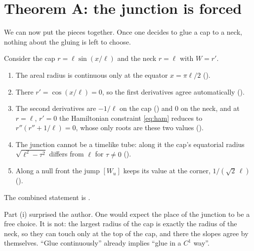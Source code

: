 \section{Theorem A: the junction is forced}

We can now put the pieces together. Once one decides to glue a cap to a neck, nothing about the gluing is left to choose.

\begin{theorem}\proved\label{thm:A}
Consider the cap $r=\ell\sin(x/\ell)$ and the neck $r=\ell$ with $W=r'$.
\begin{enumerate}[label=(\roman*)]
\item The areal radius is continuous only at the equator $x=\pi\ell/2$ ().
\item There $r'=\cos(x/\ell)=0$, so the first derivatives agree automatically ().
\item The second derivatives are $-1/\ell$ on the cap () and $0$ on the neck, and at $r=\ell$, $r'=0$ the Hamiltonian constraint \eqref{eq:ham} reduces to $r''(r''+1/\ell)=0$, whose only roots are these two values ().
\item The junction cannot be a timelike tube: along it the cap's equatorial radius $\sqrt{\ell^2-\tau^2}$ differs from $\ell$ for $\tau\ne0$ ().
\item Along a null front the jump $[W_u]$ keeps its value at the corner, $1/(\sqrt2\,\ell)$ ().
\end{enumerate}
\end{theorem}
\noindent The combined statement is .

Part (i) surprised the author. One would expect the place of the junction to be a free choice. It is not: the largest radius of the cap is exactly the radius of the neck, so they can touch only at the top of the cap, and there the slopes agree by themselves. ``Glue continuously'' already implies ``glue in a $C^1$ way''.

